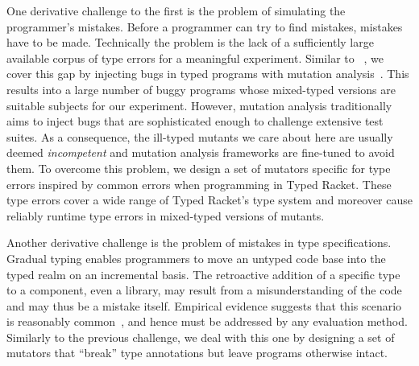 One derivative challenge to the first is the problem of simulating the
programmer's mistakes. Before a programmer can try to find mistakes, mistakes
have to be made. Technically the problem is the lack of a sufficiently large
available corpus of type errors for a meaningful experiment. Similar to
~\citet{lksfd-popl-2020}, we cover this gap by injecting bugs in typed programs
with mutation analysis~\cite{lipton1971fault, demillo1978hints,
jia2011analysis}. This results into a large number of buggy programs whose
mixed-typed versions are suitable subjects for our experiment. However, mutation
analysis traditionally aims to inject bugs that are sophisticated enough to
challenge extensive test suites. As a consequence, the ill-typed mutants we care
about here are usually deemed \emph{incompetent} and mutation analysis
frameworks are fine-tuned to avoid them. To overcome this problem, we design a
set of mutators specific for type errors inspired by common errors when
programming in Typed Racket.  These type errors cover a wide range of Typed
Racket's type system and moreover cause reliably runtime type errors in
mixed-typed versions of mutants.

Another derivative challenge is the problem of mistakes in type specifications.
Gradual typing enables programmers to move an untyped code base into the typed
realm on an incremental basis. The retroactive addition of a specific type to a
component, even a library, may result from a misunderstanding of the code and
may thus be a mistake itself. Empirical evidence suggests that this scenario is
reasonably common~\cite{sta-nt-base-types, incorrect-ts, wmwz-ecoop-2017}, and
hence must be addressed by any evaluation method. Similarly to the
previous challenge, we deal with this one by designing a set of mutators
that ``break'' type annotations but leave programs otherwise intact.

